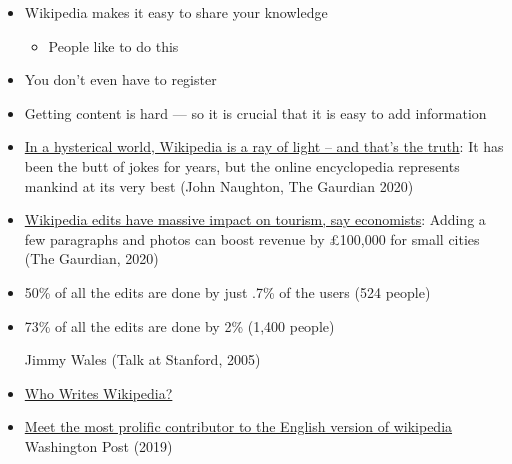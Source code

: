 \documentclass[a4paper,landscape,headrule,footrule,xetex]{foils}
\begin{document}

\begin{itemize}
\item Wikipedia makes it easy to share your knowledge
  \begin{itemize}
    \item People like to do this
  \end{itemize}
\item You don't even have to register
\item Getting content is hard --- so it is crucial that it is easy to add information
\end{itemize}



\begin{itemize}
\item
  \href{https://www.theguardian.com/commentisfree/2018/sep/02/in-hysterical-world-wikipedia-ray-of-light-truth}{In
    a hysterical world, Wikipedia is a ray of light – and that's the
    truth}: It has been the butt of jokes for years, but the online
  encyclopedia represents mankind at its very best (John Naughton, The
  Gaurdian 2020)
\item
  \href{https://www.theguardian.com/technology/2020/sep/18/wikipedia-edits-have-massive-impact-on-tourism-say-economists}{Wikipedia
    edits have massive impact on tourism, say economists}: Adding a
  few paragraphs and photos can boost revenue by £100,000 for small
  cities (The Gaurdian, 2020)

\end{itemize}


\begin{itemize}
\item 50\% of all the edits are done by just .7\% of the users (524 people)
\item 73\% of all the edits are done by 2\%  (1,400 people)
  \begin{flushright}
    Jimmy Wales (Talk at Stanford, 2005)
  \end{flushright}
\end{itemize}


\begin{itemize}
\item
  \href{https://en.wikipedia.org/wiki/Wikipedia:Who_writes_Wikipedia?}{Who
  Writes Wikipedia?}
\item 
\href{https://www.washingtonpost.com/lifestyle/magazine/meet-the-most-prolific-contributor-to-the-english-version-of-wikipedia/2018/10/02/a6497a74-9411-11e8-a679-b09212fb69c2_story.html?utm_term=.18bfc6ecda09}{Meet
  the most prolific contributor to the English version of wikipedia}
Washington Post (2019)
\end{itemize}
\end{document}
